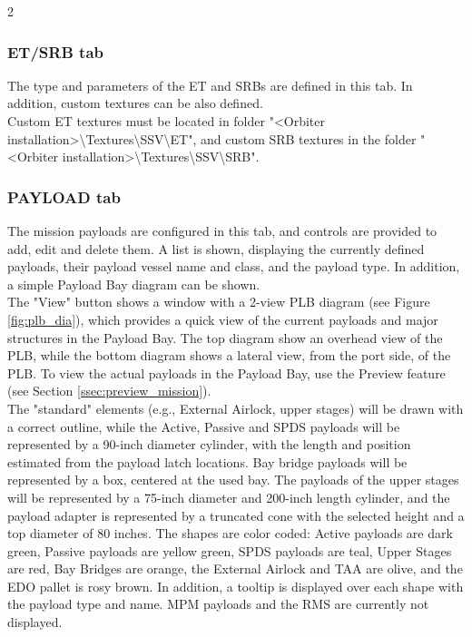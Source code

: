 \documentclass[Space_Shuttle_Vessel_Manual.tex]{subfiles}
\begin{document}
\begin{multicols*}{2}
\subsubsection{ET/SRB tab}
The type and parameters of the ET and SRBs are defined in this tab. In addition, custom textures can be also defined.\\
Custom ET textures must be located in folder "<Orbiter installation>\textbackslash Textures\textbackslash SSV\textbackslash ET", and custom SRB textures in the folder "<Orbiter installation>\textbackslash Textures\textbackslash SSV\textbackslash SRB".


\subsubsection{PAYLOAD tab}
The mission payloads are configured in this tab, and controls are provided to add, edit and delete them. A list is shown, displaying the currently defined payloads, their payload vessel name and class, and the payload type. In addition, a simple Payload Bay diagram can be shown.\\
The "View" button shows a window with a 2-view PLB diagram (see Figure \ref{fig:plb_dia}), which provides a quick view of the current payloads and major structures in the Payload Bay. The top diagram show an overhead view of the PLB, while the bottom diagram shows a lateral view, from the port side, of the PLB. To view the actual payloads in the Payload Bay, use the Preview feature (see Section \ref{ssec:preview_mission}).\\
The "standard" elements (e.g., External Airlock, upper stages) will be drawn with a correct outline, while the Active, Passive and SPDS payloads will be represented by a 90-inch diameter cylinder, with the length and position estimated from the payload latch locations. Bay bridge payloads will be represented by a box, centered at the used bay. The payloads of the upper stages will be represented by a 75-inch diameter and 200-inch length cylinder, and the payload adapter is represented by a truncated cone with the selected height and a top diameter of 80 inches. The shapes are color coded: Active payloads are dark green, Passive payloads are yellow green, SPDS payloads are teal, Upper Stages are red, Bay Bridges are orange, the External Airlock and TAA are olive, and the EDO pallet is rosy brown. In addition, a tooltip is displayed over each shape with the payload type and name. MPM payloads and the RMS are currently not displayed.


\end{multicols*}
\end{document}
